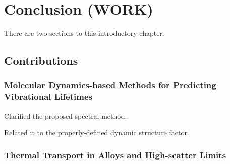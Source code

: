 \chapter{Conclusion (WORK)}
There are two sections to this introductory chapter.

\section{Contributions}

\subsection{Molecular Dynamics-based Methods for Predicting Vibrational 
Lifetimes}

Clarified the proposed spectral method.  

Related it to the properly-defined 
dynamic structure factor. 

\subsection{Thermal Transport in Alloys and High-scatter 
Limits}

